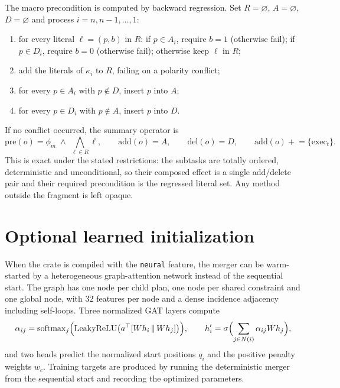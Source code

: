 \documentclass[11pt,a4paper]{article}
\newcommand{\exec}{\mathrm{exec}}
\newcommand{\pre}{\mathrm{pre}}
\newcommand{\add}{\mathrm{add}}
\newcommand{\del}{\mathrm{del}}
\newcommand{\softmax}{\operatorname{softmax}}
\begin{document}
The macro precondition is computed by backward regression. Set
$R=\varnothing$, $A=\varnothing$, $D=\varnothing$ and process
$i=n,n-1,\dots,1$:
\begin{enumerate}[leftmargin=1.6em,itemsep=1pt]
\item for every literal $\ell=(p,b)$ in $R$: if $p\in A_i$, require $b=1$
      (otherwise fail); if $p\in D_i$, require $b=0$ (otherwise fail);
      otherwise keep $\ell$ in $R$;
\item add the literals of $\kappa_i$ to $R$, failing on a polarity conflict;
\item for every $p\in A_i$ with $p\notin D$, insert $p$ into $A$;
\item for every $p\in D_i$ with $p\notin A$, insert $p$ into $D$.
\end{enumerate}
If no conflict occurred, the summary operator is
\begin{equation}
\pre(o)=\phi_m\;\wedge\;\bigwedge_{\ell\in R}\ell,
\qquad
\add(o)=A,
\qquad
\del(o)=D,
\qquad
\add(o)\mathrel{+}=\{\exec_t\}.
\label{eq:summary}
\end{equation}
This is exact under the stated restrictions: the subtasks are totally ordered,
deterministic and unconditional, so their composed effect is a single
add/delete pair and their required precondition is the regressed literal set.
Any method outside the fragment is left opaque.

\section{Optional learned initialization}

When the crate is compiled with the \texttt{neural} feature, the merger can be
warm-started by a heterogeneous graph-attention network instead of the
sequential start. The graph has one node per child plan, one node per shared
constraint and one global node, with $32$ features per node and a dense
incidence adjacency including self-loops. Three normalized GAT layers compute
\begin{equation}
\alpha_{ij}=\softmax_j\Bigl(\mathrm{LeakyReLU}\bigl(a^\top[Wh_i\,\|\,Wh_j]\bigr)\Bigr),
\qquad
h_i'=\sigma\Bigl(\sum_{j\in N(i)}\alpha_{ij}Wh_j\Bigr),
\end{equation}
and two heads predict the normalized start positions $q_i$ and the positive
penalty weights $w_c$. Training targets are produced by running the
deterministic merger from the sequential start and recording the optimized
parameters.
\end{document}
